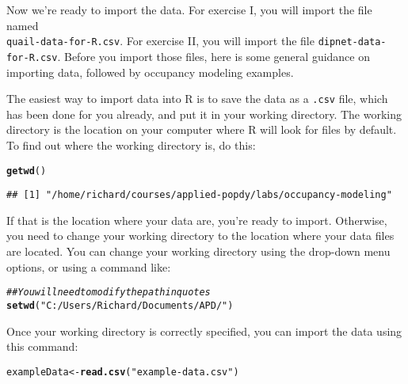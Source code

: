 \documentclass[12pt]{article}\usepackage[]{graphicx}\usepackage[]{color}
\makeatletter
\newcommand{\hlstr}[1]{\textcolor[rgb]{0.192,0.494,0.8}{#1}}%
\newcommand{\hlcom}[1]{\textcolor[rgb]{0.678,0.584,0.686}{\textit{#1}}}%
\newcommand{\hlstd}[1]{\textcolor[rgb]{0.345,0.345,0.345}{#1}}%
\newcommand{\hlkwb}[1]{\textcolor[rgb]{0.69,0.353,0.396}{#1}}%
\newcommand{\hlkwd}[1]{\textcolor[rgb]{0.737,0.353,0.396}{\textbf{#1}}}%
\newenvironment{kframe}{%
 \def\at@end@of@kframe{}%
 \ifinner\ifhmode%
  \def\at@end@of@kframe{\end{minipage}}%
  \begin{minipage}{\columnwidth}%
 \fi\fi%
 \def\FrameCommand##1{\hskip\@totalleftmargin \hskip-\fboxsep
 \colorbox{shadecolor}{##1}\hskip-\fboxsep
     \hskip-\linewidth \hskip-\@totalleftmargin \hskip\columnwidth}%
 \MakeFramed {\advance\hsize-\width
   \@totalleftmargin\z@ \linewidth\hsize
   \@setminipage}}%
 {\par\unskip\endMakeFramed%
 \at@end@of@kframe}
\newenvironment{knitrout}{}{} %
\makeatother
\begin{document}
Now we're ready to import the data. For exercise I, you will import
the file named \\ \texttt{quail-data-for-R.csv}. For exercise II, you
will import the file \texttt{dipnet-data-for-R.csv}. Before you import
those files, here is some general guidance on importing data, followed
by occupancy modeling examples.


The easiest way to import data into R is to save the data as a
\texttt{.csv} file, which has been done for you already, and put it in
your working directory. The working directory is the location on your
computer where R will look for files by default. To find out
where the working directory is, do this:  
    
\begin{knitrout}
\color{fgcolor}\begin{kframe}
\begin{alltt}
\hlkwd{getwd}\hlstd{()}
\end{alltt}
\begin{verbatim}
## [1] "/home/richard/courses/applied-popdy/labs/occupancy-modeling"
\end{verbatim}
\end{kframe}
\end{knitrout}

If that is the location where your data are, you're ready to
import. Otherwise, you need to change your working directory to the
location where your data files are located. You can change your
working directory using the drop-down menu options, or using a command
like:   

\begin{knitrout}
\color{fgcolor}\begin{kframe}
\begin{alltt}
\hlcom{## You will need to modify the path in quotes}
\hlkwd{setwd}\hlstd{(}\hlstr{"C:/Users/Richard/Documents/APD/"}\hlstd{)}
\end{alltt}
\end{kframe}
\end{knitrout}

Once your working directory is correctly specified, you can import the
data using this command: 

\begin{knitrout}
\color{fgcolor}\begin{kframe}
\begin{alltt}
\hlstd{exampleData} \hlkwb{<-} \hlkwd{read.csv}\hlstd{(}\hlstr{"example-data.csv"}\hlstd{)}
\end{alltt}
\end{kframe}
\end{knitrout}
\end{document}

